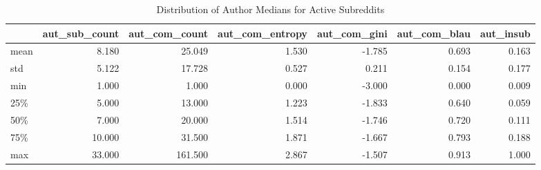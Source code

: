 \begin{table}
\centering
\begin{tabular}{lrrrrrr}
\toprule
{} &  aut\_sub\_count &  aut\_com\_count &  aut\_com\_entropy &  aut\_com\_gini &  aut\_com\_blau &  aut\_insub \\
\midrule
mean &          8.180 &         25.049 &            1.530 &        -1.785 &         0.693 &      0.163 \\
std  &          5.122 &         17.728 &            0.527 &         0.211 &         0.154 &      0.177 \\
min  &          1.000 &          1.000 &            0.000 &        -3.000 &         0.000 &      0.009 \\
25\%  &          5.000 &         13.000 &            1.223 &        -1.833 &         0.640 &      0.059 \\
50\%  &          7.000 &         20.000 &            1.514 &        -1.746 &         0.720 &      0.111 \\
75\%  &         10.000 &         31.500 &            1.871 &        -1.667 &         0.793 &      0.188 \\
max  &         33.000 &        161.500 &            2.867 &        -1.507 &         0.913 &      1.000 \\
\bottomrule
\end{tabular}
\caption{Distribution of Author Medians for Active Subreddits}
\label{table/author-medians:active}
\end{table}